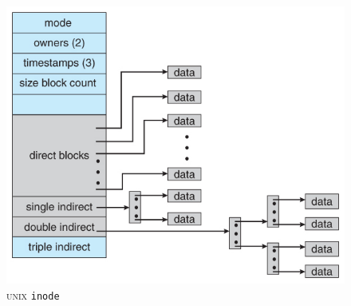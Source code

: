 \begin{figure}[h!tbp]
  \centering
  \includegraphics[scale=1.0]{./Drawings/EDAF35-Operating_Systems/UNIX_inode.jpg}
  \caption{\textsc{unix} \texttt{inode}}
  \label{fig:Inode}
\end{figure}


